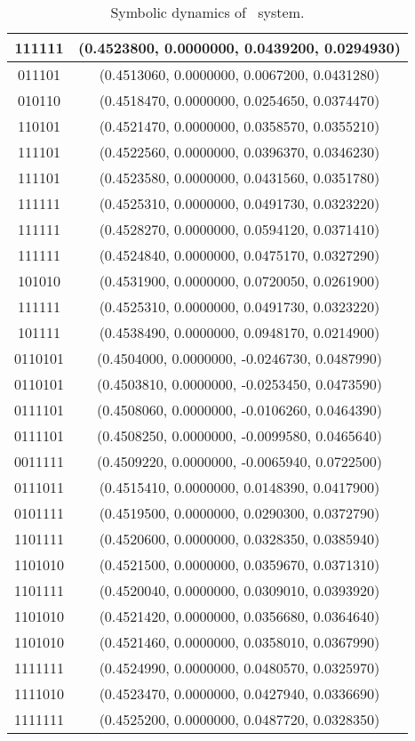 \begin{table}
\begin{tabular}{c|c}
 	\hline
	111111  & (0.4523800, 0.0000000, 0.0439200, 0.0294930) \\ 
 	\hline
	011101  & (0.4513060, 0.0000000, 0.0067200, 0.0431280) \\ 
 	\hline
	010110  & (0.4518470, 0.0000000, 0.0254650, 0.0374470) \\ 
 	\hline
	110101  & (0.4521470, 0.0000000, 0.0358570, 0.0355210) \\ 
 	\hline
	111101  & (0.4522560, 0.0000000, 0.0396370, 0.0346230) \\ 
 	\hline
	111101  & (0.4523580, 0.0000000, 0.0431560, 0.0351780) \\ 
 	\hline
	111111  & (0.4525310, 0.0000000, 0.0491730, 0.0323220) \\ 
 	\hline
	111111  & (0.4528270, 0.0000000, 0.0594120, 0.0371410) \\ 
 	\hline
	111111  & (0.4524840, 0.0000000, 0.0475170, 0.0327290) \\ 
 	\hline
	101010  & (0.4531900, 0.0000000, 0.0720050, 0.0261900) \\ 
 	\hline
	111111  & (0.4525310, 0.0000000, 0.0491730, 0.0323220) \\ 
 	\hline
	101111  & (0.4538490, 0.0000000, 0.0948170, 0.0214900) \\ 
 	\hline
	0110101  & (0.4504000, 0.0000000, -0.0246730, 0.0487990) \\ 
 	\hline
	0110101  & (0.4503810, 0.0000000, -0.0253450, 0.0473590) \\ 
 	\hline
	0111101  & (0.4508060, 0.0000000, -0.0106260, 0.0464390) \\ 
 	\hline
	0111101  & (0.4508250, 0.0000000, -0.0099580, 0.0465640) \\ 
 	\hline
	0011111  & (0.4509220, 0.0000000, -0.0065940, 0.0722500) \\ 
 	\hline
	0111011  & (0.4515410, 0.0000000, 0.0148390, 0.0417900) \\ 
 	\hline
	0101111  & (0.4519500, 0.0000000, 0.0290300, 0.0372790) \\ 
 	\hline
	1101111  & (0.4520600, 0.0000000, 0.0328350, 0.0385940) \\ 
 	\hline
	1101010  & (0.4521500, 0.0000000, 0.0359670, 0.0371310) \\ 
 	\hline
	1101111  & (0.4520040, 0.0000000, 0.0309010, 0.0393920) \\ 
 	\hline
	1101010  & (0.4521420, 0.0000000, 0.0356680, 0.0364640) \\ 
 	\hline
	1101010  & (0.4521460, 0.0000000, 0.0358010, 0.0367990) \\ 
 	\hline
	1111111  & (0.4524990, 0.0000000, 0.0480570, 0.0325970) \\ 
 	\hline
	1111010  & (0.4523470, 0.0000000, 0.0427940, 0.0336690) \\ 
 	\hline
	1111111  & (0.4525200, 0.0000000, 0.0487720, 0.0328350) \\ 
 	\end{tabular}
	\caption{Symbolic dynamics of \twoMode\ system.}
	\label{tab:symbdyn}
\end{table}